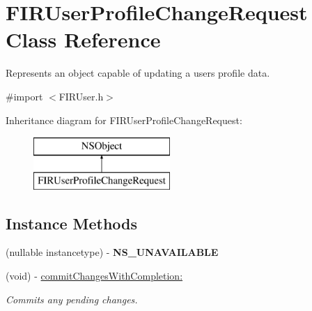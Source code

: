 \hypertarget{interface_f_i_r_user_profile_change_request}{}\section{F\+I\+R\+User\+Profile\+Change\+Request Class Reference}
\label{interface_f_i_r_user_profile_change_request}


Represents an object capable of updating a user\textquotesingle{}s profile data.  




{\ttfamily \#import $<$F\+I\+R\+User.\+h$>$}

Inheritance diagram for F\+I\+R\+User\+Profile\+Change\+Request\+:\begin{figure}[H]
\begin{center}
\leavevmode
\includegraphics[height=2.000000cm]{interface_f_i_r_user_profile_change_request}
\end{center}
\end{figure}
\subsection*{Instance Methods}
\begin{DoxyCompactItemize}
\item 
\hypertarget{interface_f_i_r_user_profile_change_request_aaf25f58740dbe3b958d1b60ca8ea4c8c}{}(nullable instancetype) -\/ {\bfseries N\+S\+\_\+\+U\+N\+A\+V\+A\+I\+L\+A\+B\+L\+E}\label{interface_f_i_r_user_profile_change_request_aaf25f58740dbe3b958d1b60ca8ea4c8c}

\item 
(void) -\/ \hyperlink{interface_f_i_r_user_profile_change_request_a7f74d324eaf3f3f4a333f91c98135597}{commit\+Changes\+With\+Completion\+:}
\begin{DoxyCompactList}\small\item\em Commits any pending changes. \end{DoxyCompactList}\end{DoxyCompactItemize}
